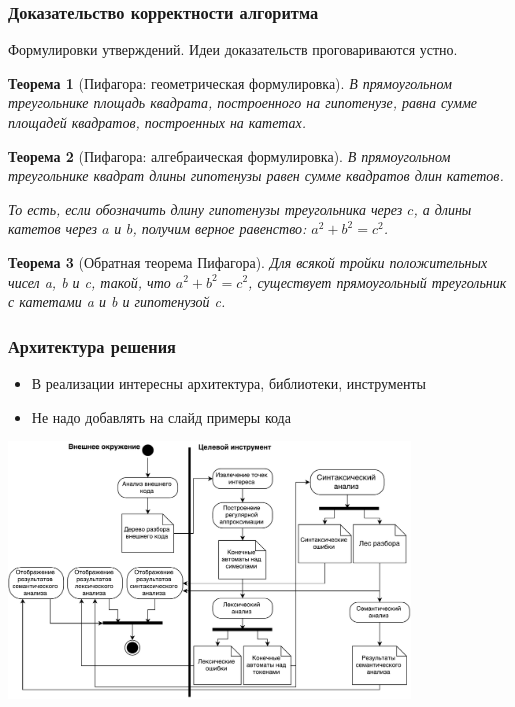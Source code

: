 \documentclass{beamer}
\newtheorem{rutheorem}{Теорема}
\begin{document}
\begin{frame}[fragile]
  \frametitle{Доказательство корректности алгоритма}
  {\tiny Формулировки утверждений. Идеи доказательств проговариваются устно.}
  \begin{rutheorem}[Пифагора: геометрическая формулировка]
    В прямоугольном треугольнике площадь квадрата, построенного на гипотенузе, равна сумме площадей квадратов, построенных на катетах.
  \end{rutheorem}

  \begin{rutheorem}[Пифагора: алгебраическая формулировка]
    В прямоугольном треугольнике квадрат длины гипотенузы равен сумме квадратов длин катетов.

    То есть, если обозначить длину гипотенузы треугольника через $c$, а длины катетов
    через $a$ и $b$, получим верное равенство: $a^2 + b^2 = c^2$.
  \end{rutheorem}

  \begin{rutheorem}[Обратная теорема Пифагора]
    Для всякой тройки положительных чисел a, b и c, такой, что $a^2 + b^2 = c^2$, существует прямоугольный треугольник с катетами a и b и гипотенузой c.
  \end{rutheorem}
\end{frame}

\begin{frame}[fragile]
  \frametitle{Архитектура решения}
  \begin{itemize}
    \item В реализации интересны архитектура, библиотеки, инструменты
    \item Не надо добавлять на слайд примеры кода
  \end{itemize}
  \begin{center}
    \includegraphics[width=0.8\textwidth]{pictures/Activ_SEL_Processing.pdf}
  \end{center}
\end{frame}
\end{document}
